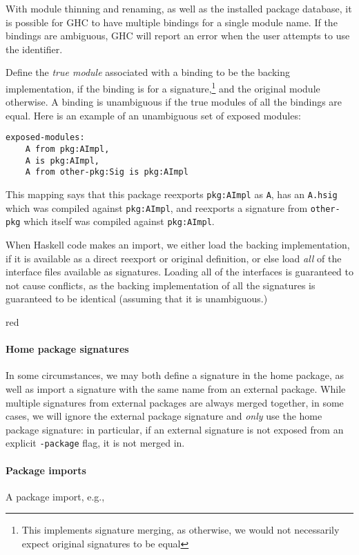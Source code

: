 \documentclass{article}
\newcommand{\Red}[1]{{\color{red} #1}}
\begin{document}
With module thinning and renaming, as well as the installed package
database, it is possible for GHC to have multiple bindings for a single
module name.  If the bindings are ambiguous, GHC will report an error
when the user attempts to use the identifier.

Define the \emph{true module} associated with a binding to be the
backing implementation, if the binding is for a signature,\footnote{This
implements signature merging, as otherwise, we would not necessarily
expect original signatures to be equal} and the original module
otherwise.  A binding is unambiguous if the true modules of all the
bindings are equal.  Here is an example of an unambiguous set of exposed
modules:

\begin{verbatim}
exposed-modules:
    A from pkg:AImpl,
    A is pkg:AImpl,
    A from other-pkg:Sig is pkg:AImpl
\end{verbatim}

This mapping says that this package reexports \texttt{pkg:AImpl} as
\texttt{A}, has an \texttt{A.hsig} which was compiled against
\texttt{pkg:AImpl}, and reexports a signature from \texttt{other-pkg}
which itself was compiled against \texttt{pkg:AImpl}.

When Haskell code makes an import, we either load the backing implementation,
if it is available as a direct reexport or original definition, \Red{or else
load \emph{all} of the interface files available as signatures.  Loading
all of the interfaces is guaranteed to not cause conflicts, as the
backing implementation of all the signatures is guaranteed to be identical
(assuming that it is unambiguous.)}

\begin{color}{red}
\paragraph{Home package signatures}  In some circumstances, we may
both define a signature in the home package, as well as import a
signature with the same name from an external package.  While multiple
signatures from external packages are always merged together, in some
cases, we will ignore the external package signature and \emph{only}
use the home package signature: in particular, if an external signature
is not exposed from an explicit \texttt{-package} flag, it is not
merged in.
\end{color}

\paragraph{Package imports} A package import, e.g.,
\end{document}

